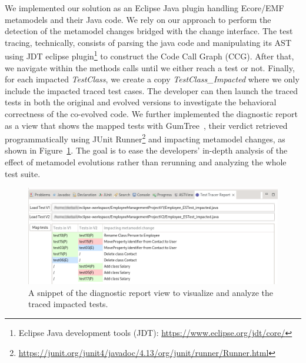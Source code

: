 We implemented our solution as an Eclipse Java plugin handling Ecore/EMF metamodels and their Java code. %
We rely on our approach \cite{khelladi2015detecting} to perform the detection of the metamodel changes bridged with the change interface. 
The test tracing, technically, consists of parsing the java code and manipulating its AST using JDT eclipse plugin\footnote{Eclipse Java development tools (JDT): \url{https://www.eclipse.org/jdt/core/}} to construct the Code Call Graph (CCG). After that, we navigate within the methods calls until we either reach a test or not. Finally, for each impacted \emph{TestClass}, we create a copy \emph{TestClass\_Impacted} where we only include the impacted traced test cases. The developer can then launch the traced tests in both the original and evolved versions to investigate the behavioral correctness of the co-evolved code. 
%
We further implemented the diagnostic report as a view that shows the mapped tests with GumTree~\cite{falleri2014fine}, their verdict retrieved programmatically using JUnit Runner\footnote{\url{https://junit.org/junit4/javadoc/4.13/org/junit/runner/Runner.html}} and impacting metamodel changes, as shown in Figure~\ref{fig:toolView}. The goal is to ease the developers' in-depth analysis of the effect of metamodel evolutions rather than rerunning and analyzing the whole test suite.

\begin{figure}[tb]
\centering
\includegraphics[width=1\textwidth]{./pics/chapter2pics/TestTraceReport.png}
\caption{A snippet of the diagnostic report view to visualize and analyze the traced impacted tests.}
\label{fig:toolView}
\end{figure}